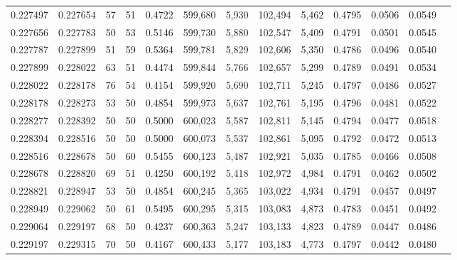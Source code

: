 \begin{tabular}{rrrrrrrrrrrrr}
0.227497 & 0.227654 &    57 &  51 &                                     0.4722 & 599,680 &   5,930 & 102,494 &   5,462 & 0.4795 & 0.0506 & 0.0549 \\
0.227656 & 0.227783 &    50 &  53 &                                     0.5146 & 599,730 &   5,880 & 102,547 &   5,409 & 0.4791 & 0.0501 & 0.0545 \\
0.227787 & 0.227899 &    51 &  59 &                                     0.5364 & 599,781 &   5,829 & 102,606 &   5,350 & 0.4786 & 0.0496 & 0.0540 \\
0.227899 & 0.228022 &    63 &  51 &                                     0.4474 & 599,844 &   5,766 & 102,657 &   5,299 & 0.4789 & 0.0491 & 0.0534 \\
0.228022 & 0.228178 &    76 &  54 &                                     0.4154 & 599,920 &   5,690 & 102,711 &   5,245 & 0.4797 & 0.0486 & 0.0527 \\
0.228178 & 0.228273 &    53 &  50 &                                     0.4854 & 599,973 &   5,637 & 102,761 &   5,195 & 0.4796 & 0.0481 & 0.0522 \\
0.228277 & 0.228392 &    50 &  50 &                                     0.5000 & 600,023 &   5,587 & 102,811 &   5,145 & 0.4794 & 0.0477 & 0.0518 \\
0.228394 & 0.228516 &    50 &  50 &                                     0.5000 & 600,073 &   5,537 & 102,861 &   5,095 & 0.4792 & 0.0472 & 0.0513 \\
0.228516 & 0.228678 &    50 &  60 &                                     0.5455 & 600,123 &   5,487 & 102,921 &   5,035 & 0.4785 & 0.0466 & 0.0508 \\
0.228678 & 0.228820 &    69 &  51 &                                     0.4250 & 600,192 &   5,418 & 102,972 &   4,984 & 0.4791 & 0.0462 & 0.0502 \\
0.228821 & 0.228947 &    53 &  50 &                                     0.4854 & 600,245 &   5,365 & 103,022 &   4,934 & 0.4791 & 0.0457 & 0.0497 \\
0.228949 & 0.229062 &    50 &  61 &                                     0.5495 & 600,295 &   5,315 & 103,083 &   4,873 & 0.4783 & 0.0451 & 0.0492 \\
0.229064 & 0.229197 &    68 &  50 &                                     0.4237 & 600,363 &   5,247 & 103,133 &   4,823 & 0.4789 & 0.0447 & 0.0486 \\
0.229197 & 0.229315 &    70 &  50 &                                     0.4167 & 600,433 &   5,177 & 103,183 &   4,773 & 0.4797 & 0.0442 & 0.0480 \\

\end{tabular}
